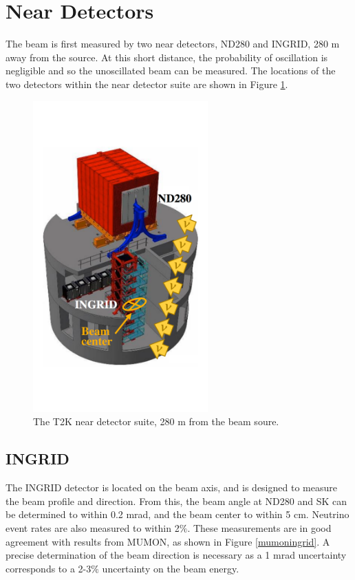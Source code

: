 \section{Near Detectors}\label{sec:nd}

The beam is first measured by two near detectors, ND280 and INGRID, 280 m away from the source. At this short distance, the probability of oscillation is negligible and so the unoscillated beam can be measured. The locations of the two detectors within the near detector suite are shown in Figure \ref{ndpit}.

\begin{figure}
\centering
\includegraphics*[width=0.6\textwidth,trim={0 10cm 0 10cm},clip]{figs/ndpitcenter}
\caption{The T2K near detector suite, 280 m from the beam soure.} \label{ndpit}
\end{figure}

\subsection{INGRID}\label{sec:ingrid}

The INGRID detector is located on the beam axis, and is designed to measure the beam profile and direction. From this, the beam angle at ND280 and SK can be determined to within 0.2 mrad, and the beam center to within 5 cm. Neutrino event rates are also measured to within 2$\%$. These measurements are in good agreement with results from MUMON, as shown in Figure \ref{mumoningrid}. A precise determination of the beam direction is necessary as a 1 mrad uncertainty corresponds to a 2-3$\%$ uncertainty on the beam energy.

